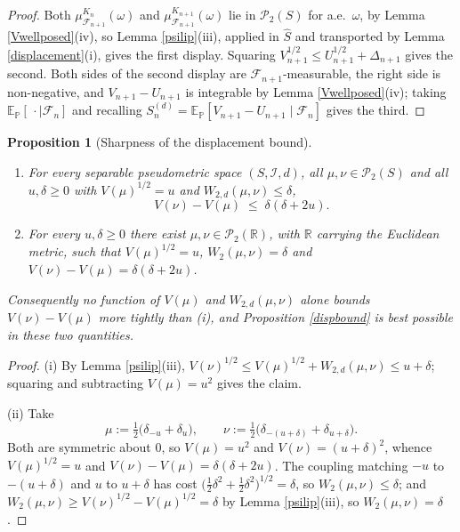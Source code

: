 \documentclass{article}
\newcommand{\E}{\mathbb{E}_{\mathbb{P}}}
\newcommand{\F}{\mathcal{F}}
\newcommand{\I}{\mathcal{I}}
\newcommand{\1}{\mathbbm{1}}
\newtheorem{prop}{Proposition}
\begin{document}
\begin{proof}
Both $\mu^{K_n}_{\F_{n+1}}(\omega)$ and $\mu^{K_{n+1}}_{\F_{n+1}}(\omega)$ lie in
$\mathcal{P}_2(S)$ for a.e.\ $\omega$, by Lemma \ref{Vwellposed}(iv), so Lemma \ref{psilip}(iii),
applied in $\hat S$ and transported by Lemma \ref{displacement}(i), gives the first display. Squaring
$V_{n+1}^{1/2}\le U_{n+1}^{1/2}+\Delta_{n+1}$ gives the second. Both sides of the second display are
$\F_{n+1}$-measurable, the right side is non-negative, and $V_{n+1}-U_{n+1}$ is integrable by Lemma
\ref{Vwellposed}(iv); taking $\E[\,\cdot\mid\F_n]$ and recalling
$S_n^{(d)}=\E[V_{n+1}-U_{n+1}\mid\F_n]$ gives the third.
\end{proof}

\begin{prop}[Sharpness of the displacement bound]
\label{dispsharp}
\begin{enumerate}
\item[(i)] For every separable pseudometric space $(S,\I,d)$, all $\mu,\nu\in\mathcal{P}_2(S)$ and
all $u,\delta\ge0$ with $V(\mu)^{1/2}=u$ and $W_{2,d}(\mu,\nu)\le\delta$,
\[
V(\nu)-V(\mu)\;\le\;\delta(\delta+2u).
\]
\item[(ii)] For every $u,\delta\ge0$ there exist $\mu,\nu\in\mathcal{P}_2(\mathbb{R})$, with
$\mathbb{R}$ carrying the Euclidean metric, such that $V(\mu)^{1/2}=u$,
$W_{2}(\mu,\nu)=\delta$ and $V(\nu)-V(\mu)=\delta(\delta+2u)$.
\end{enumerate}
Consequently no function of $V(\mu)$ and $W_{2,d}(\mu,\nu)$ alone bounds $V(\nu)-V(\mu)$ more
tightly than (i), and Proposition \ref{dispbound} is best possible in these two quantities.
\end{prop}

\begin{proof}
(i) By Lemma \ref{psilip}(iii), $V(\nu)^{1/2}\le V(\mu)^{1/2}+W_{2,d}(\mu,\nu)\le u+\delta$;
squaring and subtracting $V(\mu)=u^2$ gives the claim.

(ii) Take
\[
\mu:=\tfrac12\big(\delta_{-u}+\delta_{u}\big),\qquad
\nu:=\tfrac12\big(\delta_{-(u+\delta)}+\delta_{u+\delta}\big).
\]
Both are symmetric about $0$, so $V(\mu)=u^2$ and $V(\nu)=(u+\delta)^2$, whence
$V(\mu)^{1/2}=u$ and $V(\nu)-V(\mu)=\delta(\delta+2u)$. The coupling matching $-u$ to
$-(u+\delta)$ and $u$ to $u+\delta$ has cost $\big(\tfrac12\delta^2+\tfrac12\delta^2\big)^{1/2}
=\delta$, so $W_2(\mu,\nu)\le\delta$; and $W_2(\mu,\nu)\ge V(\nu)^{1/2}-V(\mu)^{1/2}=\delta$ by
Lemma \ref{psilip}(iii), so $W_2(\mu,\nu)=\delta$.
\end{proof}
\end{document}
